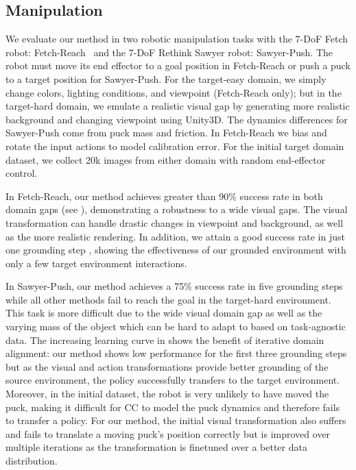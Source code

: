 \subsection{Manipulation}

We evaluate our method in two robotic manipulation tasks with the 7-DoF Fetch robot: Fetch-Reach~\citep{plappert2018robotics} and the 7-DoF Rethink Sawyer robot: Sawyer-Push. The robot must move its end effector to a goal position in Fetch-Reach or push a puck to a target position for Sawyer-Push. For the target-easy domain, we simply change colors, lighting conditions, and viewpoint (Fetch-Reach only); but in the target-hard domain, we emulate a realistic visual gap by generating more realistic background and changing viewpoint using Unity3D.  The dynamics differences for Sawyer-Push come from puck mass and friction. In Fetch-Reach we bias and rotate the input actions to model calibration error.  For the initial target domain dataset, we collect 20k images from either domain with random end-effector control.

In Fetch-Reach, our method achieves greater than 90\% success rate in both domain gaps (see ), demonstrating a robustness to a wide visual gaps.  The visual transformation can handle drastic changes in viewpoint and background, as well as the more realistic rendering.  In addition, we attain a good success rate in just one grounding step , showing the effectiveness of our grounded environment with only a few target environment interactions.

In Sawyer-Push, our method achieves a 75\% success rate in five grounding steps while all other methods fail to reach the goal in the target-hard environment. This task is more difficult due to the wide visual domain gap as well as the varying mass of the object which can be hard to adapt to based on task-agnostic data.  The increasing learning curve in  shows the benefit of iterative domain alignment: our method shows low performance for the first three grounding steps but as the visual and action transformations provide better grounding of the source environment, the policy successfully transfers to the target environment.  Moreover, in the initial dataset, the robot is very unlikely to have moved the puck, making it difficult for CC to model the puck dynamics and therefore fails to transfer a policy.  For our method, the initial visual transformation also suffers and fails to translate a moving puck's position correctly but is improved over multiple iterations as the transformation is finetuned over a better data distribution.  

